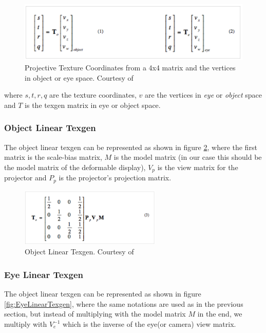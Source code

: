 \documentclass[]{article}
\begin{document}
\begin{figure}[hbtp]
    \centering
    \includegraphics[width=1.0\textwidth]{figures/PTMCoordinates.PNG}
    \caption{Projective Texture Coordinates from a 4x4 matrix and the vertices in object or eye space. Courtesy of \cite{cassNvidia}}
    \label{fig:ProjectiveTextureMapping}
\end{figure}

where $s, t, r, q$ are the texture coordinates, $v$ are the vertices in \textit{eye} or \textit{object} space and $T$ is the texgen matrix in eye or object space.

\subsubsection{Object Linear Texgen}

The object linear texgen can be represented as shown in figure \ref{fig:ObjectLinearTexgen}, where the first matrix is the scale-bias matrix, $M$ is the model matrix (in our case this should be the model matrix of the deformable display), $V_{p}$ is the view matrix for the projector and $P_{p}$ is the projector's projection matrix.

\begin{figure}[hbtp]
    \centering
    \includegraphics[width=0.6\textwidth]{figures/ObjectLinearTexgen.PNG}
    \caption{Object Linear Texgen. Courtesy of \cite{cassNvidia}}
    \label{fig:ObjectLinearTexgen}
\end{figure}

\subsubsection{Eye Linear Texgen}

The object linear texgen can be represented as shown in figure \ref{fig:EyeLinearTexgen}, where the same notations are used as in the previous section, but instead of multiplying with the model matrix $M$ in the end, we multiply with $V^{-1}_{e}$ which is the inverse of the eye(or camera) view matrix.
\end{document}
